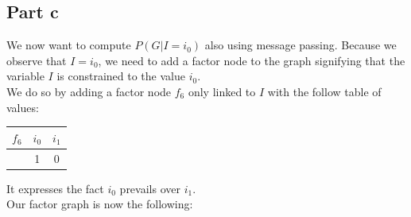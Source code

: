 \documentclass[a4paper, 10pt]{article}
\begin{document}
\subsection{Part c}
We now want to compute $P(G\vert I=i_0)$ also using message passing.
Because we observe that $I=i_0$, we need to add a factor node to the graph signifying
that the variable $I$ is constrained to the value $i_0$. 
\\
We do so by adding a factor node $f_6$ only linked to $I$ with the follow table of values:
\begin{center}
\begin{tabular}{ |c|c|c| }
    \hline
    $f_6$ & $i_0$ & $i_1$ \\
    \hline
          & 1 & 0 \\
    \hline
\end{tabular}
\end{center}
It expresses the fact $i_0$ prevails over $i_1$.
\\
Our factor graph is now the following:
\end{document}

